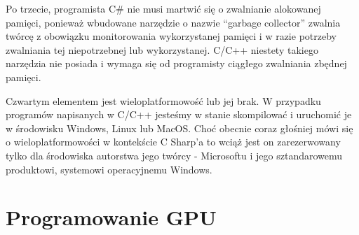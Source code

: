 \documentclass{article}
\begin{document}
	Po trzecie, programista C# nie musi martwić się o zwalnianie alokowanej pamięci, ponieważ wbudowane narzędzie o nazwie “garbage collector” zwalnia twórcę z obowiązku monitorowania wykorzystanej pamięci i w razie potrzeby zwalniania tej niepotrzebnej lub wykorzystanej. C/C++ niestety takiego narzędzia nie posiada i wymaga się od programisty ciągłego zwalniania zbędnej pamięci.
	\par
	Czwartym elementem jest wieloplatformowość lub jej brak. W przypadku programów napisanych w C/C++ jesteśmy w stanie skompilować i uruchomić je w środowisku Windows, Linux lub MacOS. Choć obecnie coraz głośniej mówi się o wieloplatformowości w kontekście C Sharp’a to wciąż jest on zarezerwowany tylko dla środowiska autorstwa jego twórcy - Microsoftu i jego sztandarowemu produktowi, systemowi operacyjnemu Windows.
	\section{Programowanie GPU}
\end{document}
